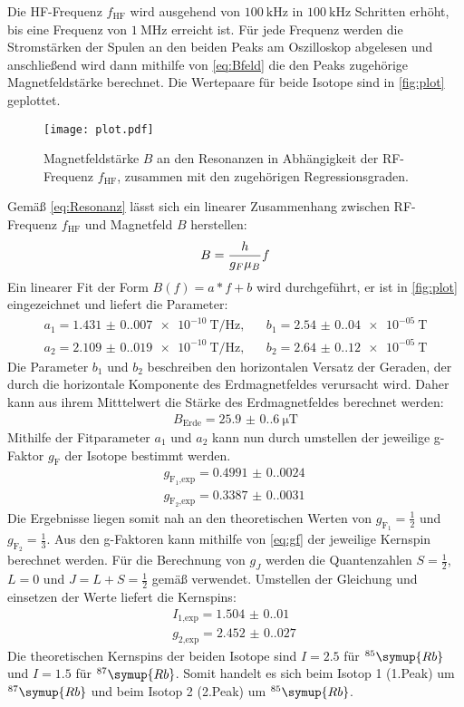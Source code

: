 Die HF-Frequenz $f_{\text{HF}}$ wird ausgehend von $\qty{100}{\kilo\hertz}$ in $\qty{100}{\kilo\hertz}$ Schritten erhöht,
bis eine Frequenz von $\qty{1}{\mega\hertz}$ erreicht ist.
Für jede Frequenz werden die Stromstärken der Spulen an den beiden Peaks am Oszilloskop abgelesen und anschließend wird
dann mithilfe von \eqref{eq:Bfeld} die den Peaks zugehörige Magnetfeldstärke berechnet.
Die Wertepaare für beide Isotope sind in \autoref{fig:plot} geplottet.

\begin{figure} [H]
  \centering
  \texttt{[image: plot.pdf]}
  \caption{Magnetfeldstärke $B$ an den Resonanzen in Abhängigkeit der RF-Frequenz $f_{\text{HF}}$, zusammen mit den zugehörigen Regressionsgraden.}
  \label{fig:plot}
\end{figure}

Gemäß \eqref{eq:Resonanz} lässt sich ein linearer Zusammenhang zwischen RF-Frequenz $f_{\text{HF}}$ und Magnetfeld $B$ herstellen:
\begin{equation}
  B = \frac{h}{g_F \mu_B}f
  \notag
\end{equation}
Ein linearer Fit der Form $B(f)=a*f+b$ wird durchgeführt, er ist in \autoref{fig:plot} eingezeichnet und liefert die Parameter:
\begin{align*}
  a_1 = \qty{1.431(0.007)e-10}{\tesla\per\hertz}, &&b_1 =\qty{2.54(0.04)e-05}{\tesla} \\
  a_2 = \qty{2.109(0.019)e-10}{\tesla\per\hertz}, &&b_2 =\qty{2.64(0.12)e-05}{\tesla}
\end{align*}
Die Parameter $b_1$ und $b_2$ beschreiben den horizontalen Versatz der Geraden, der durch die horizontale Komponente
des Erdmagnetfeldes verursacht wird. Daher kann aus ihrem Mitttelwert die Stärke des Erdmagnetfeldes berechnet werden: 
\begin{align*}
  B_{\text{Erde}} = \qty{25.9(0.6)}{\micro\tesla}
\end{align*}
Mithilfe der Fitparameter $a_1$ und $a_2$ kann nun durch umstellen der jeweilige g-Faktor $g_{\text{F}}$ der Isotope bestimmt werden.
\begin{align*}
  g_{\text{F}_1\text{,exp}} = \qty{0.4991(0.0024)}{} \\
  g_{\text{F}_2\text{,exp}} = \qty{0.3387(0.0031)}{}
\end{align*}
Die Ergebnisse liegen somit nah an den theoretischen Werten von $g_{\text{F}_1}=\frac{1}{2}$ und $g_{\text{F}_2}=\frac{1}{3}$.
Aus den g-Faktoren kann mithilfe von \eqref{eq:gf} der jeweilige Kernspin berechnet werden. Für die Berechnung von $g_J$ 
werden die Quantenzahlen $S=\frac{1}{2}$, $L=0$ und $J=L+S=\frac{1}{2}$ gemäß \cite{Optical_Pumping} verwendet.
Umstellen der Gleichung und einsetzen der Werte liefert die Kernspins:
\begin{align*}
  I_{1\text{,exp}} = \qty{1.504(0.010)}{} \\
  g_{2\text{,exp}} = \qty{2.452(0.027)}{}
\end{align*}
Die theoretischen Kernspins der beiden Isotope sind $I=2.5$ für $^{85}\symup{Rb}$ und $I=1.5$ für $^{87}\symup{Rb}$.
Somit handelt es sich beim Isotop 1 (1.Peak) um $^{87}\symup{Rb}$ und beim Isotop 2 (2.Peak) um $^{85}\symup{Rb}$.

